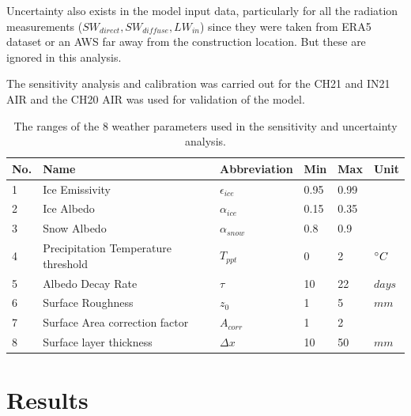\documentclass[utf8]{frontiersSCNS} %
\begin{document}
Uncertainty also exists in the model input data, particularly for all the radiation measurements ($SW_{direct},
	SW_{diffuse}, LW_{in}$) since they were taken from ERA5 dataset or an AWS far away from the construction location.
But these are ignored in this analysis.

The sensitivity analysis and calibration was carried out for the CH21 and IN21 AIR and the CH20 AIR was used for
validation of the model.

\begin{table}
	\centering
	\caption{The ranges of the 8 weather parameters used in the sensitivity and uncertainty analysis.}
	\label{tab:parameters}
	\begin{tabular}{@{}llllll@{}}
		\toprule
		\textbf{No.} & \textbf{Name}                       & \textbf{Abbreviation} & \textbf{Min} & \textbf{Max} & \textbf{Unit} \\\midrule
		1            & Ice Emissivity                      & $\epsilon_{ice}$      & 0.95         & 0.99         &               \\
		2            & Ice Albedo                          & $\alpha_{ice}$        & 0.15         & 0.35         &               \\
		3            & Snow Albedo                         & $\alpha_{snow}$       & 0.8          & 0.9          &               \\
		4            & Precipitation Temperature threshold & $T_{ppt}$             & 0            & 2            & $\degree C$   \\
		5            & Albedo Decay Rate                   & $\tau$                & 10           & 22           & $days$        \\
		6            & Surface Roughness                   & $z_0$                 & 1            & 5            & $mm$          \\
		7            & Surface Area correction factor      & $A_{corr}$            & 1            & 2            &               \\
		8            & Surface layer thickness             & $\Delta x$            & 10           & 50           & $mm$          \\\bottomrule
	\end{tabular}
\end{table}

\section{Results}
\end{document}

